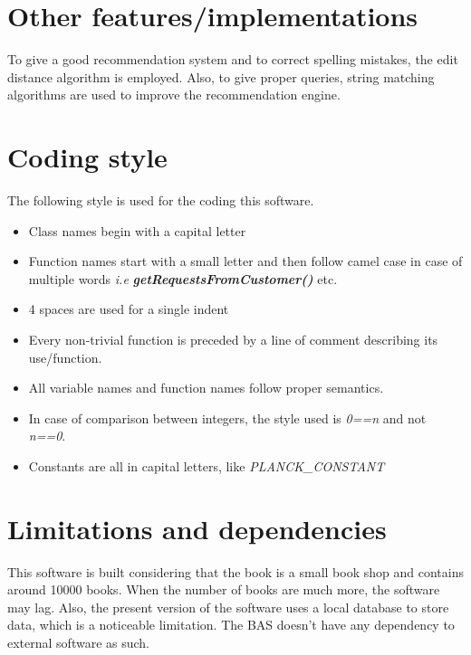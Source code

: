 \documentclass{scrreprt}
\begin{document}
\section{Other features/implementations}
To give a good recommendation system and to correct spelling mistakes, the edit distance algorithm is employed. Also, to give proper queries, string matching algorithms are used to improve the recommendation engine.

\section{Coding style}
The following style is used for the coding this software.
\begin{itemize}
\item Class names begin with a capital letter
\item Function names start with a small letter and then follow camel case in case of multiple words \emph{i.e} \textbf{\emph{getRequestsFromCustomer()}} etc.  
\item 4 spaces are used for a single indent 
\item Every non-trivial function is preceded by a line of comment describing its use/function.
\item All variable names and function names follow proper semantics.
\item In case of comparison between integers, the style used is \emph{0==n} and not \emph{n==0}.
\item Constants are all in capital letters, like \emph{PLANCK_CONSTANT}
\end{itemize}

\section{Limitations and dependencies}
This software is built considering that the book is a small book shop and contains around 10000 books. When the number of books are much more, the software may lag. Also, the present version of the software uses a local database to store data, which is a noticeable limitation. The BAS doesn't have any dependency to external software as such.

\end{document}
